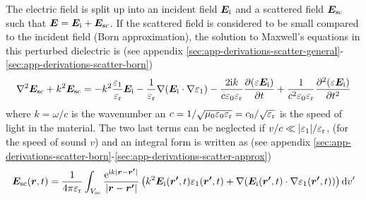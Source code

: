 \documentclass[11pt,twoside]{eitExjobb}
\begin{document}
	The electric field is split up into an incident field $\bm{E}_{\mathrm{i}}$ and a scattered field $\bm{E}_{\mathrm{sc}}$ such that $\bm{E} = \bm{E}_{\mathrm{i}} + \bm{E}_{\mathrm{sc}}$. If the scattered field is considered to be small compared to the incident field (Born approximation), the solution to Maxwell's equations in this perturbed dielectric is (see appendix \ref{sec:app-derivations-scatter-general}-\ref{sec:app-derivations-scatter-born})
	\begin{equation*}
		\nabla^2\bm{E}_{\mathrm{sc}} + k^2 \bm{E}_{\mathrm{sc}} =	-k^2 \frac{\varepsilon_1}{\varepsilon_{\mathrm{r}}} \bm{E}_{\mathrm{i}} -\frac{1}{\varepsilon_{\mathrm{r}}}\nabla(\bm{E}_{\mathrm{i}} \cdot \nabla \varepsilon_1) - \frac{2\mathrm{i} k}{c\varepsilon_0\varepsilon_{\mathrm{r}}} \frac{\partial (\varepsilon \bm{E}_{\mathrm{i}})}{\partial t} + \frac{1}{c^2 \varepsilon_0 \varepsilon_{\mathrm{r}}} \frac{\partial^2 (\varepsilon \bm{E}_{\mathrm{i}})}{\partial t^2}
	\end{equation*}
	where $k = \omega/c$ is the wavenumber an $c = 1/\sqrt{\mu_0 \varepsilon_0 \varepsilon_{\mathrm{r}}} = c_0/\sqrt{\varepsilon_{\mathrm{r}}}$ is the speed of light in the material. The two last terms can be neglected if $v/c \ll |\varepsilon_1|/\varepsilon_{\mathrm{r}}$, (for the speed of sound $v$) and an integral form is written as (see appendix \ref{sec:app-derivations-scatter-born}-\ref{sec:app-derivations-scatter-approx})
	\begin{equation}
		\bm{E}_{\mathrm{sc}}(\bm{r},t) = \frac{1}{4\pi\varepsilon_{\mathrm{r}}} \int_{V_{\mathrm{sc}}} \frac{\mathrm{e}^{\mathrm{i} k |\bm{r}-\bm{r'}| }}{ |\bm{r}-\bm{r'}|} \left( k^2 \bm{E}_{\mathrm{i}} (\bm{r'},t) \varepsilon_1 (\bm{r'},t) + \nabla (\bm{E}_{\mathrm{i}} (\bm{r'},t) \cdot \nabla \varepsilon_1 (\bm{r'},t)) \right) \mathrm{d}v'
		\label{eq:an-scatter-int}
	\end{equation}
	
\end{document}
